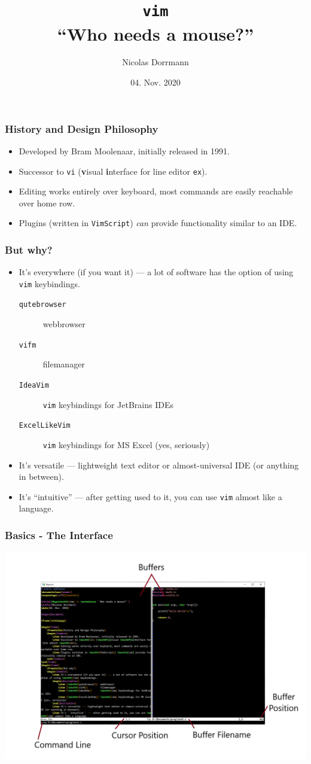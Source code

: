 \documentclass{beamer}
\title{\Huge\texttt{vim} \\ \normalsize ``Who needs a mouse?''}
\author{Nicolas Dorrmann}
\date{04. Nov. 2020}
\begin{document}
\frame{\titlepage}

\begin{frame}
    \frametitle{History and Design Philosophy}
    \begin{itemize}
        \item Developed by Bram Moolenaar, initially released in 1991.
        \item Successor to \texttt{vi} (\textbf{v}isual \textbf{i}nterface for line editor \texttt{ex}).
        \item Editing works entirely over keyboard, most commands are easily reachable over home row.
        \item Plugins (written in \texttt{VimScript}) \textit{can} provide functionality similar to an IDE.
    \end{itemize}
\end{frame}
\begin{frame}
    \frametitle{But why?}
    \begin{itemize}
        \item It's everywhere (if you want it) --- a lot of software has the option of using \texttt{vim} keybindings.
        \begin{description}
            \item [\texttt{qutebrowser}]  webbrowser
            \item [\texttt{vifm}]         filemanager
            \item [\texttt{IdeaVim}]      \texttt{vim} keybindings for JetBrains IDEs
            \item [\texttt{ExcelLikeVim}] \texttt{vim} keybindings for MS Excel (yes, seriously)
        \end{description}
        \item It's versatile --- lightweight text editor or almost-universal IDE (or anything in between).
        \item It's ``intuitive'' --- after getting used to it, you can use \texttt{vim} almost like a language.
    \end{itemize}
\end{frame}
\begin{frame}
    \frametitle{Basics - The Interface}
    \begin{center}
    \includegraphics[width=\textwidth]{graphics/vim_screen_annotated.png}
    \end{center}
\end{frame}
\end{document}

